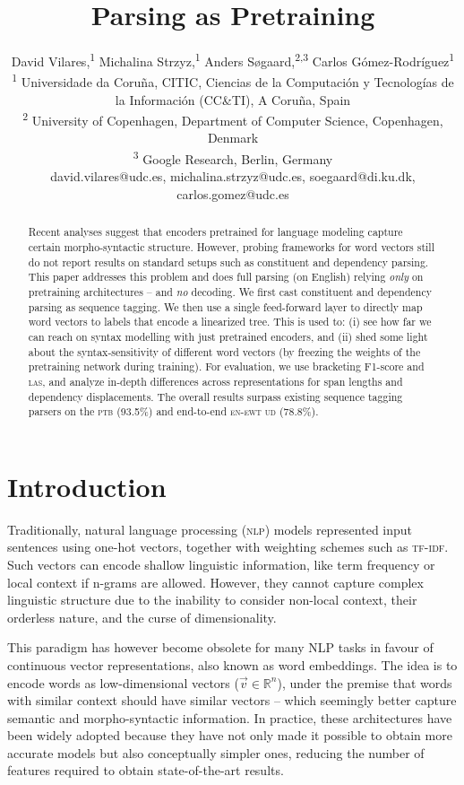 \documentclass[letterpaper]{article} %
\title{Parsing as Pretraining}
\author{David Vilares,\textsuperscript{\rm 1} Michalina Strzyz,\textsuperscript{\rm 1} Anders S{\o}gaard,\textsuperscript{\rm 2,3} Carlos G{\'o}mez-Rodr{\'i}guez\textsuperscript{\rm 1} \\  %
\textsuperscript{\rm 1} Universidade da Coru{\~n}a, CITIC,  Ciencias de la Computaci{\'o}n y Tecnolog{\'i}as de la Informaci{\'o}n (CC\&TI), A Coru{\~n}a, Spain\\
\textsuperscript{\rm 2} University of Copenhagen, Department of Computer Science, Copenhagen, Denmark\\ \textsuperscript{\rm 3} Google Research, Berlin, Germany\\
david.vilares@udc.es, michalina.strzyz@udc.es, soegaard@di.ku.dk, carlos.gomez@udc.es%
}
\begin{document}
\maketitle

\begin{abstract}

Recent analyses suggest that encoders pretrained for language modeling capture certain morpho-syntactic structure. However, probing frameworks for word vectors still do not report results on standard setups such as constituent and dependency parsing. This paper addresses this problem and does full parsing (on English) relying \emph{only} on pretraining architectures -- and {\em no} decoding. We first cast constituent and dependency parsing as sequence tagging. We then use a single feed-forward layer to directly map word vectors to labels that encode a linearized tree. This is used to: (i) see how far we can reach on syntax modelling with just pretrained encoders, and (ii) shed some light about the syntax-sensitivity of different word vectors (by freezing the weights of the pretraining network during training). For evaluation, we use bracketing F1-score and \textsc{las}, and analyze in-depth differences across representations for span lengths and dependency displacements. The overall results surpass existing sequence tagging parsers on the \textsc{ptb} (93.5\%) and end-to-end \textsc{en-ewt ud} (78.8\%). 

\end{abstract}

\section{Introduction}

Traditionally, natural language processing (\textsc{nlp}) models  represented input sentences using one-hot vectors, together with weighting schemes such as \textsc{tf-idf}. Such vectors can encode shallow linguistic information, like term frequency or local context if n-grams are allowed. However, they cannot capture complex linguistic structure due to the inability to consider non-local context, their orderless nature, and the curse of dimensionality.

This paradigm has however become obsolete for many NLP tasks in favour of  continuous vector representations, also known as word embeddings. The idea is to encode words as low-dimensional vectors ($\vec{v} \in \mathbb{R}^n$), under the premise that words with similar context should have similar vectors -- which seemingly better capture semantic and morpho-syntactic information. In practice, these architectures have been widely adopted because they have not only made it possible to obtain more accurate models but also conceptually simpler ones, reducing the number of features required to obtain state-of-the-art results. 
\end{document}
